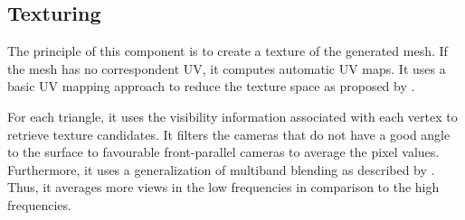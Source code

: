 \documentclass[12pt]{report}
\begin{document}
\begin{table}[H]
  \centering
  \caption{Meshroom Mesh FilteringNode}
  \label{tab:MeshFiltering}
  \end{table}

  \subsection{Texturing}
  The principle of this component is to create a texture of the generated mesh.
  If the mesh has no correspondent UV, it computes automatic UV maps. It uses a basic UV mapping approach to reduce the texture space as proposed by .
  
  For each triangle, it uses the visibility information associated with each vertex to retrieve texture candidates.
  It filters the cameras that do not have a good angle to the surface to favourable front-parallel cameras to average the pixel values.
  Furthermore, it uses a generalization of multiband blending as described by . Thus, it averages more views in the low frequencies in comparison to the high frequencies.
  
\end{document}
